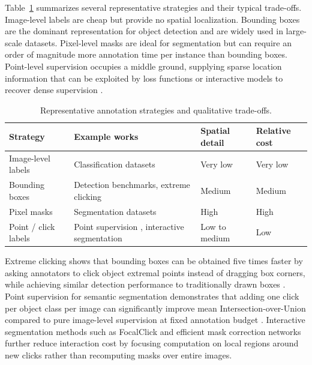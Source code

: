 \documentclass[twocolumn, 10pt]{article}
\begin{document}
Table~\ref{tab:annotation_strategies} summarizes several representative strategies and their typical trade-offs. Image-level labels are cheap but provide no spatial localization. Bounding boxes are the dominant representation for object detection and are widely used in large-scale datasets. Pixel-level masks are ideal for segmentation but can require an order of magnitude more annotation time per instance than bounding boxes. Point-level supervision occupies a middle ground, supplying sparse location information that can be exploited by loss functions or interactive models to recover dense supervision \cite{Bearman2016Whats}.

\begin{table}[t]
    \centering
    \caption{Representative annotation strategies and qualitative trade-offs.}
    \label{tab:annotation_strategies}
    \begin{tabular}{p{1.9cm}p{2.4cm}p{1.1cm}p{1.4cm}}
        \toprule
        Strategy & Example works & Spatial detail & Relative cost \\
        \midrule
        Image-level labels & Classification datasets & Very low & Very low \\
        Bounding boxes & Detection benchmarks, extreme clicking \cite{Papadopoulos2017Extreme} & Medium & Medium \\
        Pixel masks & Segmentation datasets & High & High \\
        Point / click labels & Point supervision \cite{Bearman2016Whats}, interactive segmentation \cite{Chen2022FocalClick,Du2023EfficientMask} & Low to medium & Low \\
        \bottomrule
    \end{tabular}
\end{table}

Extreme clicking shows that bounding boxes can be obtained five times faster by asking annotators to click object extremal points instead of dragging box corners, while achieving similar detection performance to traditionally drawn boxes \cite{Papadopoulos2017Extreme}. Point supervision for semantic segmentation demonstrates that adding one click per object class per image can significantly improve mean Intersection-over-Union compared to pure image-level supervision at fixed annotation budget \cite{Bearman2016Whats}. Interactive segmentation methods such as FocalClick \cite{Chen2022FocalClick} and efficient mask correction networks \cite{Du2023EfficientMask} further reduce interaction cost by focusing computation on local regions around new clicks rather than recomputing masks over entire images.
\end{document}
